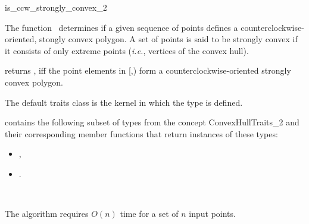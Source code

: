 

\begin{ccRefFunction}{is_ccw_strongly_convex_2}  

\ccDefinition
  
The function \ccRefName\ determines if a given sequence of points defines
a counterclockwise-oriented, stongly convex polygon.  
A set of points is said to be strongly convex 
if it consists of only extreme points
(\textit{i.e.}, vertices of the convex hull).


           {returns , iff the point elements in 
            [,)
            form a counterclockwise-oriented strongly convex polygon.
           }


The default traits class  is the kernel in which the
type  is defined.

 contains the following subset of types from
the concept ConvexHullTraits\_2 and their corresponding member
functions that return instances of these types:
\begin{itemize}
   \item {}, 
   \item {}.
\end{itemize}


\ccSeeAlso

 \\


\ccImplementation

The algorithm requires $O(n)$ time for a set of $n$ input points.


\end{ccRefFunction}


